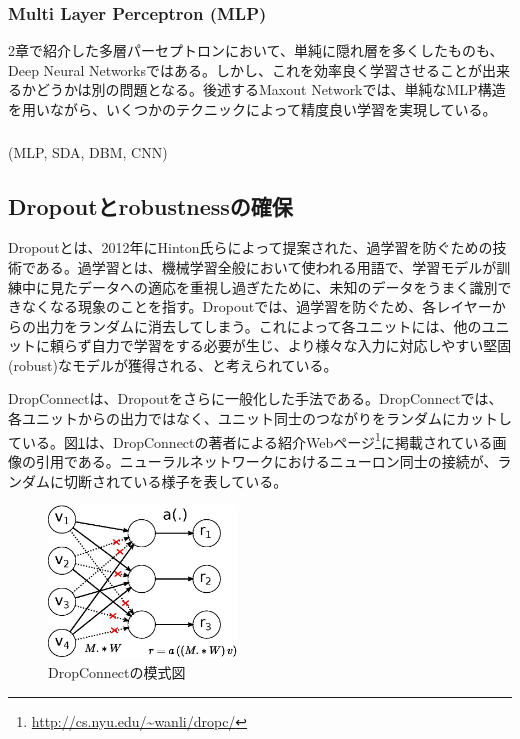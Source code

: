 \subsubsection{Multi Layer Perceptron (MLP)}
2章で紹介した多層パーセプトロンにおいて、単純に隠れ層を多くしたものも、Deep Neural Networksではある。しかし、これを効率良く学習させることが出来るかどうかは別の問題となる。後述するMaxout Networkでは、単純なMLP構造を用いながら、いくつかのテクニックによって精度良い学習を実現している。
\subsubsection{}
(MLP, SDA, DBM, CNN)

\subsection{Dropoutとrobustnessの確保}
\label{c3_dropout}
Dropoutとは、2012年にHinton氏らによって提案された、過学習を防ぐための技術である\cite{hinton2012improving}。過学習とは、機械学習全般において使われる用語で、学習モデルが訓練中に見たデータへの適応を重視し過ぎたために、未知のデータをうまく識別できなくなる現象のことを指す。Dropoutでは、過学習を防ぐため、各レイヤーからの出力をランダムに消去してしまう。これによって各ユニットには、他のユニットに頼らず自力で学習をする必要が生じ、より様々な入力に対応しやすい堅固(robust)なモデルが獲得される、と考えられている。\par
DropConnectは、Dropoutをさらに一般化した手法である。DropConnectでは、各ユニットからの出力ではなく、ユニット同士のつながりをランダムにカットしている。図\ref{c3_dropconnect}は、DropConnectの著者による紹介Webページ\footnote{\url{http://cs.nyu.edu/~wanli/dropc/}}に掲載されている画像の引用である。ニューラルネットワークにおけるニューロン同士の接続が、ランダムに切断されている様子を表している。
\begin{figure}[tbp]
 \begin{center}
  \includegraphics[width=50mm]{img/c3/nn_dc}
 \end{center}
 \caption{DropConnectの模式図}
 \label{c3_dropconnect}
\end{figure}
